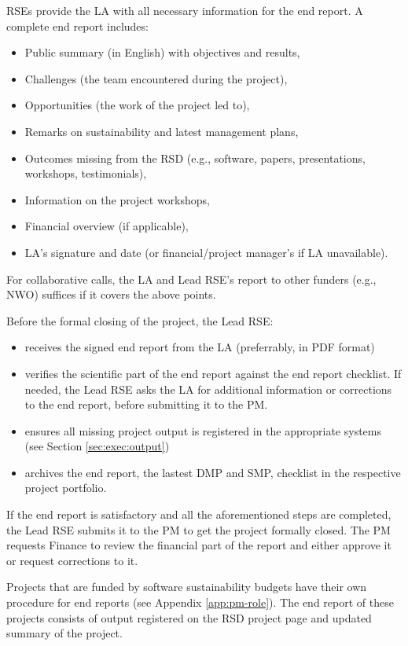 RSEs provide the LA with all necessary information for the end report.%
A complete end report includes:
\begin{itemize}
\item Public summary (in English) with objectives and results,
\item Challenges (the team encountered during the project),
\item Opportunities (the work of the project led to),
\item Remarks on sustainability and latest management plans,
\item Outcomes missing from the RSD (e.g., software, papers, presentations, workshops, testimonials),
\item Information on the project workshops,
\item Financial overview (if applicable),
\item LA's signature and date (or financial/project manager's if LA unavailable).
\end{itemize}
For collaborative calls, the LA and Lead RSE's report to other funders (e.g., NWO) suffices if it covers the above points.

Before the formal closing of the project, the Lead RSE:
\begin{itemize}
   \item receives the signed end report from the LA (preferrably, in PDF format)
   \item verifies the scientific part of the end report against the end report checklist. If needed, the Lead RSE asks the LA for additional information or corrections to the end report, before submitting it to the PM. 
   \item ensures all missing project output is registered in the appropriate systems (see Section \ref{sec:exec:output}) 
   \item archives the end report, the lastest DMP and SMP, checklist in the respective project portfolio.
\end{itemize}
If the end report is satisfactory and all the aforementioned steps are completed, the Lead RSE submits it to the PM to get the project formally closed. The PM requests Finance to review the financial 
part of the report and either approve it or request corrections to it. 

Projects that are funded by software sustainability budgets have their own procedure for end reports (see Appendix
\ref{app:pm-role}). The end report of these projects consists of output registered on the RSD project page and
updated summary of the project.


